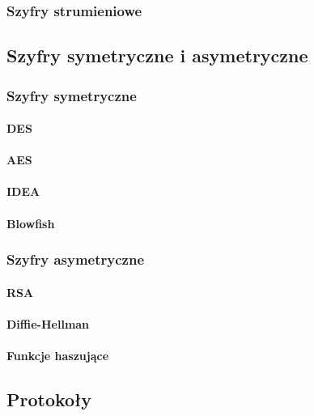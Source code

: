 \documentclass[12p]{article}
\begin{document}
\subsubsection{Szyfry strumieniowe}

\subsection{Szyfry symetryczne i asymetryczne}

\subsubsection{Szyfry symetryczne}
\paragraph{DES}
\paragraph{AES}
\paragraph{IDEA}
\paragraph{Blowfish}
\subsubsection{Szyfry asymetryczne}
\paragraph{RSA}
\paragraph{Diffie-Hellman}
\paragraph{Funkcje haszujące}

\subsection{Protokoły}
\end{document}

